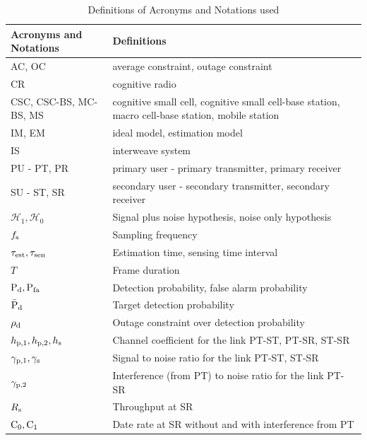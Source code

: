 \begin{table}
\renewcommand{\arraystretch}{1.4}
\caption{Definitions of Acronyms and Notations used}
\label{tb:tb1}
\centering
\begin{tabular}{p{}||p{}}
\hline
\bfseries Acronyms and Notations & \bfseries Definitions \\
\hline\hline
AC, OC & average constraint, outage constraint \\ \hline
CR & cognitive radio\\ \hline
CSC, CSC-BS, MC-BS, MS & cognitive small cell, cognitive small cell-base station, macro cell-base station, mobile station\\ \hline
IM, EM & ideal model, estimation model \\ \hline
IS & interweave system \\ \hline
PU - PT, PR & primary user - primary transmitter, primary receiver \\ \hline
SU - ST, SR & secondary user - secondary transmitter, secondary receiver \\ \hline
$\mathcal H_1, \mathcal H_0$ & Signal plus noise hypothesis, noise only hypothesis\\ \hline
$f_{\text{s}}$ & Sampling frequency\\ \hline
$\tau_{\text{est}}, \tau_{\text{sen}}$ & Estimation time, sensing time interval\\ \hline
$T$ & Frame duration\\ \hline
$\text{P}_{\text{d}}, \text{P}_{\text{fa}}$ & Detection probability, false alarm probability \\ \hline
$\bar{\text{P}}_{\text{d}}$ & Target detection probability\\ \hline
$\rho_{\text{d}}$ & Outage constraint over detection probability\\ \hline
$h_{\text{p,1}}, h_{\text{p,2}}, h_{\text{s}}$ & Channel coefficient for the link PT-ST, PT-SR, ST-SR \\ \hline
${\gamma}_{\text{p,1}}, {\gamma}_{\text{s}}$ & Signal to noise ratio for the link PT-ST, ST-SR \\ \hline
${\gamma}_{\text{p,2}}$ & Interference (from PT) to noise ratio for the link PT-SR \\ \hline
$R_{\text{s}}$ & Throughput at SR\\ \hline
$\text{C}_{\text{0}},\text{C}_{\text{1}}$ & Date rate at SR without and with interference from PT  \\ \hline

\end{tabular}
\end{table}
